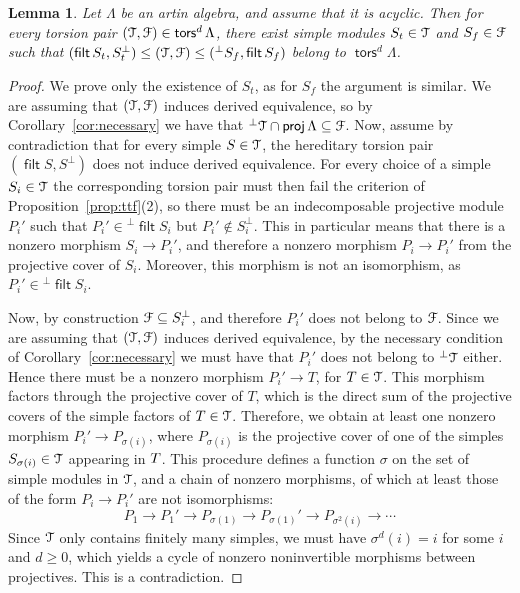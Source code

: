 \documentclass[a4paper,11pt]{amsart}
\theoremstyle{plain}
\newtheorem{lemma}[thm]{Lemma}
\theoremstyle{definition}
\DeclareMathOperator{\proj}{\mathsf{proj}}
\let\top\relax
\DeclareMathOperator{\top}{\mathsf{top}}
\DeclareMathOperator{\filt}{\mathsf{filt}}
\DeclareMathOperator{\tors}{\mathsf{tors}}
\begin{document}
\begin{lemma}\label{lemma:acyclic}
	Let $\Lambda$ be an artin algebra, and assume that it is acyclic. Then for
	every torsion pair $(\Tcal,\Fcal)\in\tors^d\Lambda$, there exist simple
	modules $S_t\in\mathcal{T}$ and $S_f\in\mathcal{F}$ such that $(\filt S_t,S_t^\bot)\leq
	(\Tcal,\Fcal)\leq({}^\bot S_f,\filt S_f)$ belong to $\tors^d\Lambda$.
\end{lemma}

\begin{proof}
	We prove only the existence of $S_t$, as for $S_f$ the argument is
	similar.
	We are assuming that $(\mathcal{T},\mathcal{F})$ induces derived equivalence, so by
	Corollary~\ref{cor:necessary} we have that
	${}^\bot\Tcal\cap\proj\Lambda\subseteq \Fcal$. Now, assume by contradiction
	that for every simple $S\in\mathcal{T}$, the hereditary torsion pair $(\filt
	S,S^\bot)$ does not induce derived equivalence. For every choice of a simple
	$S_i\in\mathcal{T}$ the corresponding torsion pair must then fail the criterion of
	Proposition~\ref{prop:ttf}(2), so there must be an indecomposable
	projective module $P_i'$ such that $P_i'\in {}^\bot\filt S_i$ but $P_i'\notin
	S_i^\bot$. This in particular means that there is a nonzero morphism $S_i\to
	P_i'$, and therefore a nonzero morphism $P_i\to P_i'$ from the projective cover of
	$S_i$. Moreover, this morphism is not an isomorphism, as $P_i'\in{}^\bot\filt S_i$.

	Now, by construction $\mathcal{F}\subseteq S_i^\bot$, and therefore $P_i'$ does not
	belong to $\mathcal{F}$. Since we are assuming that $(\mathcal{T},\mathcal{F})$ induces derived
	equivalence, by the necessary condition of Corollary~\ref{cor:necessary} we
	must have that $P_i'$ does not belong to ${}^\bot\mathcal{T}$ either. Hence there
	must be a nonzero morphism $P_i'\to T$, for $T\in\mathcal{T}$. This morphism factors
	through the projective cover of $T$, which is the direct sum of the projective
	covers of the simple factors of $\top T\in\Tcal$. Therefore, we obtain at
	least one nonzero morphism $P_i'\to P_{\sigma(i)}$, where $P_{\sigma(i)}$ is
	the projective cover of one of the simples $S_{\sigma(i)}\in \mathcal{T}$ appearing
	in $\top T$. This procedure defines a function $\sigma$ on the set of simple
	modules in $\mathcal{T}$, and
	a chain of nonzero morphisms, of which at least those of the form
	$P_i\to P_i'$ are not isomorphisms:
	\[P_1\to P_1'\to P_{\sigma(1)}\to P_{\sigma(1)}'\to P_{\sigma^2(i)}\to \cdots\]
	Since $\mathcal{T}$ only contains finitely many simples, we must have
	$\sigma^d(i)=i$ for some $i$ and $d\geq 0$, which yields a cycle of nonzero
	noninvertible morphisms between projectives. This is a contradiction.
\end{proof}
\end{document}
